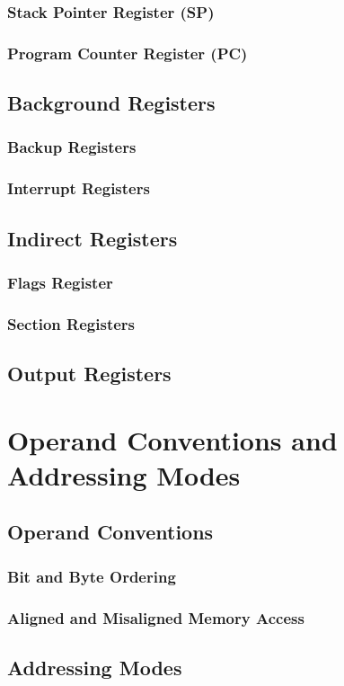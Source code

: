 \documentclass[oneside, a4paper]{memoir}
\begin{document}
\subsection{Stack Pointer Register (SP)}
\subsection{Program Counter Register (PC)}
\section{Background Registers}
\subsection{Backup Registers}
\subsection{Interrupt Registers}
\section{Indirect Registers}
\subsection{Flags Register}
\subsection{Section Registers}
\section{Output Registers}

\chapter{Operand Conventions and Addressing Modes}
\section{Operand Conventions}
\subsection{Bit and Byte Ordering}
\subsection{Aligned and Misaligned Memory Access}
\section{Addressing Modes}
\end{document}
